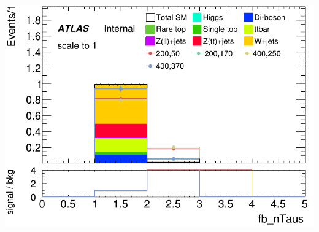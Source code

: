 \documentclass[usenames,dvipsnames]{beamer}
\begin{document}
\begin{frame}
\begin{minipage}{0.32\textwidth}
        \includegraphics[width=\textwidth]{graphics/LH_met_sig/LH_fb_nTaus_norm.png}
    \end{minipage}
    \vspace{0.5cm}
    

\end{frame}
\end{document}
